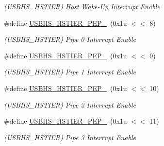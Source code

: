 \begin{DoxyCompactItemize}
\begin{DoxyCompactList}\small\item\em (U\+S\+B\+H\+S\+\_\+\+H\+S\+T\+I\+ER) Host Wake-\/\+Up Interrupt Enable \end{DoxyCompactList}\item 
\mbox{\label{group__SAMS70__USBHS_gad0230c5800f4e19ff2dbb9ae8b23dbf3}} 
\#define \mbox{\hyperlink{group__SAMS70__USBHS_gad0230c5800f4e19ff2dbb9ae8b23dbf3}{U\+S\+B\+H\+S\+\_\+\+H\+S\+T\+I\+E\+R\+\_\+\+P\+E\+P\+\_}}~(0x1u $<$$<$ 8)
\begin{DoxyCompactList}\small\item\em (U\+S\+B\+H\+S\+\_\+\+H\+S\+T\+I\+ER) Pipe 0 Interrupt Enable \end{DoxyCompactList}\item 
\mbox{\label{group__SAMS70__USBHS_gaa39fdd07d706a1f440341bb3f8d80ce1}} 
\#define \mbox{\hyperlink{group__SAMS70__USBHS_gaa39fdd07d706a1f440341bb3f8d80ce1}{U\+S\+B\+H\+S\+\_\+\+H\+S\+T\+I\+E\+R\+\_\+\+P\+E\+P\+\_}}~(0x1u $<$$<$ 9)
\begin{DoxyCompactList}\small\item\em (U\+S\+B\+H\+S\+\_\+\+H\+S\+T\+I\+ER) Pipe 1 Interrupt Enable \end{DoxyCompactList}\item 
\mbox{\label{group__SAMS70__USBHS_ga54ca3a88fabdca09432aba2c9bf90255}} 
\#define \mbox{\hyperlink{group__SAMS70__USBHS_ga54ca3a88fabdca09432aba2c9bf90255}{U\+S\+B\+H\+S\+\_\+\+H\+S\+T\+I\+E\+R\+\_\+\+P\+E\+P\+\_}}~(0x1u $<$$<$ 10)
\begin{DoxyCompactList}\small\item\em (U\+S\+B\+H\+S\+\_\+\+H\+S\+T\+I\+ER) Pipe 2 Interrupt Enable \end{DoxyCompactList}\item 
\mbox{\label{group__SAMS70__USBHS_ga95892174d0850867e1e083048aaab773}} 
\#define \mbox{\hyperlink{group__SAMS70__USBHS_ga95892174d0850867e1e083048aaab773}{U\+S\+B\+H\+S\+\_\+\+H\+S\+T\+I\+E\+R\+\_\+\+P\+E\+P\+\_}}~(0x1u $<$$<$ 11)
\begin{DoxyCompactList}\small\item\em (U\+S\+B\+H\+S\+\_\+\+H\+S\+T\+I\+ER) Pipe 3 Interrupt Enable \end{DoxyCompactList}\item 

\end{DoxyCompactItemize}
